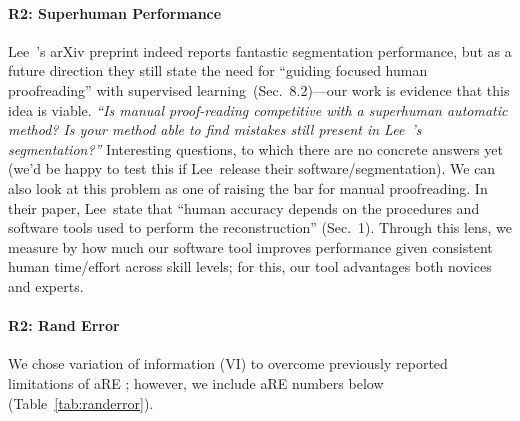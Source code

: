 \documentclass[10pt,twocolumn,letterpaper]{article}
\begin{document}
\paragraph{R2: Superhuman Performance} Lee~\etal's arXiv preprint indeed reports fantastic segmentation performance, but as a future direction they still state the need for ``guiding focused human proofreading'' with supervised learning~(Sec.~8.2)---our work is evidence that this idea is viable. \newline \noindent \emph{``Is manual proof-reading competitive with a superhuman automatic method? Is your method able to find mistakes still present in Lee~\etal's segmentation?''} Interesting questions, to which there are no concrete answers yet (we'd be happy to test this if Lee~\etal release their software/segmentation). We can also look at this problem as one of raising the bar for manual proofreading. In their paper, Lee~\etal state that ``human accuracy depends on the procedures and software tools used to perform the reconstruction'' (Sec.~1). Through this lens, we measure by how much our software tool improves performance given consistent human time/effort across skill levels; for this, our tool advantages both novices and experts.


\paragraph{R2: Rand Error} We chose variation of information (VI) to overcome previously reported limitations of aRE \cite[p.~5]{NunezIglesias2013Machine}; however, we include aRE numbers below (Table~\ref{tab:randerror}).

\begin{table}[h]
\caption{Forced Choice User Experiment in adapted Rand Error (aRE) metric (lower is better). Novices and experts using GP perform better than using FP.}
\label{tab:randerror}
\end{table}
\end{document}

